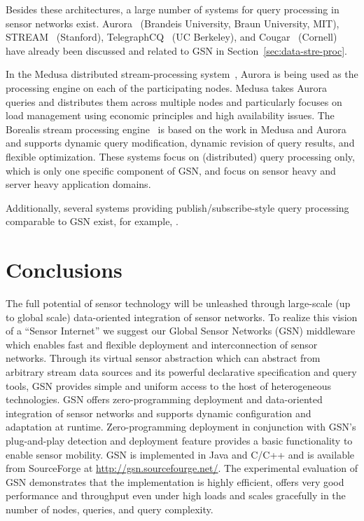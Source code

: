 Besides these architectures, a large number of systems for query processing in
sensor networks exist. Aurora~\cite{Cherniack03} (Brandeis University, Braun
University, MIT), STREAM~\cite{Arasu06} (Stanford),
TelegraphCQ~\cite{Chandrasekaran03} (UC Berkeley), and Cougar~\cite{Yao03}
(Cornell) have already been discussed and related to GSN in
Section~\ref{sec:data-stre-proc}.


In the Medusa distributed stream-processing system~\cite{Zdonik03}, Aurora is
being used as the processing engine on each of the participating nodes. Medusa
takes Aurora queries and distributes them across multiple nodes and
particularly focuses on load management using economic principles and high
availability issues. The Borealis stream processing engine~\cite{Abadi05} is
based on the work in Medusa and Aurora and supports dynamic query modification,
dynamic revision of query results, and flexible optimization. These systems
focus on (distributed) query processing only, which is only one specific
component of GSN, and focus on sensor heavy and server heavy application
domains.

Additionally, several systems providing publish/subscribe-style query
processing comparable to GSN exist, for example, \cite{Gray05}.

\section{Conclusions}
\label{sec:conclusions}

The full potential of sensor technology will be unleashed through large-scale
(up to global scale) data-oriented integration of sensor networks. To realize
this vision of a ``Sensor Internet'' we suggest our Global Sensor Networks
(GSN) middleware which enables fast and flexible deployment and interconnection
of sensor networks. Through its virtual sensor abstraction which can abstract
from arbitrary stream data sources and its powerful declarative specification
and query tools, GSN provides simple and uniform access to the host of
heterogeneous technologies. GSN offers zero-programming deployment and
data-oriented integration of sensor networks and supports dynamic configuration
and adaptation at runtime. Zero-programming deployment in conjunction with
GSN's plug-and-play detection and deployment feature provides a basic
functionality to enable sensor mobility. GSN is implemented in Java and C/C++
and is available from SourceForge at \url{http://gsn.sourcefourge.net/}.
The experimental evaluation of GSN demonstrates that the implementation is
highly efficient, offers very good performance and throughput even under high
loads and scales gracefully in the number of nodes, queries, and query
complexity.




